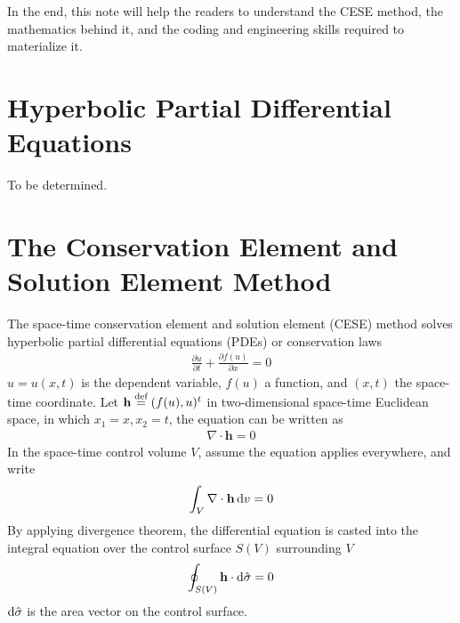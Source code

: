 \documentclass{turgon}
\begin{document}
In the end, this note will help the readers to understand the CESE method, the
mathematics behind it, and the coding and engineering skills required to
materialize it.

\chapter{Hyperbolic Partial Differential Equations}
\label{c:hyper}

To be determined.


\chapter{The Conservation Element and Solution Element Method}
\label{c:cese}


The space-time conservation element and solution element (CESE) method solves
hyperbolic partial differential equations (PDEs) or conservation
laws \citep{lax_hyperbolic_1973}
\begin{align*}
  \frac{\partial u}{\partial t} + \frac{\partial f(u)}{\partial x} = 0
\end{align*}
$u = u(x, t)$ is the dependent variable, $f(u)$ a function, and $(x, t)$ the
space-time coordinate.  Let $\mathbf{h} \defeq (f(u),u)^t$ in two-dimensional
space-time Euclidean space, in which $x_1=x, x_2=t$, the equation can be
written as
\begin{align*}
  \nabla\cdot\mathbf{h} = 0
\end{align*}
In the space-time control volume $V$, assume the equation applies everywhere,
and write
\begin{align*}
  \int_V\nabla\cdot\mathbf{h}\mathop{}\!\mathrm{d} v = 0
\end{align*}
By applying divergence theorem, the differential equation is casted into the
integral equation over the control surface $S(V)$ surrounding $V$
\begin{align*}
  \oint_{S(V)}\mathbf{h}\cdot\mathop{}\!\mathrm{d}\hat{\sigma} = 0
\end{align*}
$\mathop{}\!\mathrm{d}\hat{\sigma}$ is the area vector on the control surface.
\end{document}
